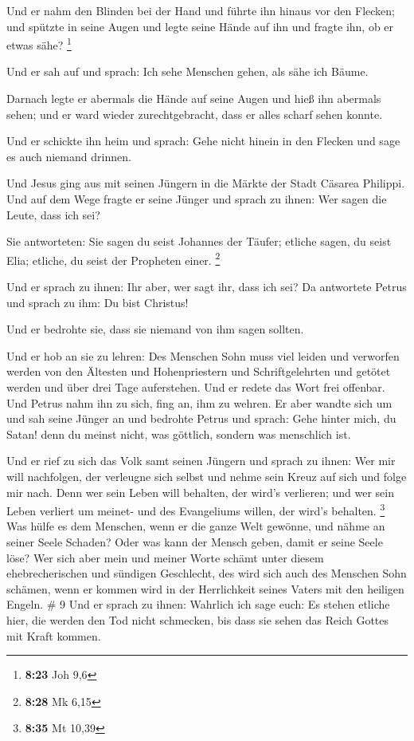  Und er nahm den Blinden bei der Hand und führte ihn hinaus
vor den Flecken; und spützte in seine Augen und legte seine Hände auf
ihn und fragte ihn, ob er etwas sähe? \footnote{\textbf{8:23} Joh 9,6}

 Und er sah auf und sprach: Ich sehe Menschen gehen, als
sähe ich Bäume.

 Darnach legte er abermals die Hände auf seine Augen und
hieß ihn abermals sehen; und er ward wieder zurechtgebracht, dass er
alles scharf sehen konnte.

 Und er schickte ihn heim und sprach: Gehe nicht hinein in
den Flecken und sage es auch niemand drinnen.

 Und Jesus ging aus mit seinen Jüngern in die Märkte der
Stadt Cäsarea Philippi. Und auf dem Wege fragte er seine Jünger und
sprach zu ihnen: Wer sagen die Leute, dass ich sei?

 Sie antworteten: Sie sagen du seist Johannes der Täufer;
etliche sagen, du seist Elia; etliche, du seist der Propheten einer.
\footnote{\textbf{8:28} Mk 6,15}

 Und er sprach zu ihnen: Ihr aber, wer sagt ihr, dass ich
sei? Da antwortete Petrus und sprach zu ihm: Du bist Christus!

 Und er bedrohte sie, dass sie niemand von ihm sagen
sollten.

 Und er hob an sie zu lehren: Des Menschen Sohn muss viel
leiden und verworfen werden von den Ältesten und Hohenpriestern und
Schriftgelehrten und getötet werden und über drei Tage auferstehen.
 Und er redete das Wort frei offenbar. Und Petrus nahm ihn
zu sich, fing an, ihm zu wehren.  Er aber wandte sich um
und sah seine Jünger an und bedrohte Petrus und sprach: Gehe hinter
mich, du Satan! denn du meinst nicht, was göttlich, sondern was
menschlich ist.

 Und er rief zu sich das Volk samt seinen Jüngern und
sprach zu ihnen: Wer mir will nachfolgen, der verleugne sich selbst und
nehme sein Kreuz auf sich und folge mir nach.  Denn wer
sein Leben will behalten, der wird's verlieren; und wer sein Leben
verliert um meinet- und des Evangeliums willen, der wird's behalten.
\footnote{\textbf{8:35} Mt 10,39}  Was hülfe es dem
Menschen, wenn er die ganze Welt gewönne, und nähme an seiner Seele
Schaden?  Oder was kann der Mensch geben, damit er seine
Seele löse?  Wer sich aber mein und meiner Worte schämt
unter diesem ehebrecherischen und sündigen Geschlecht, des wird sich
auch des Menschen Sohn schämen, wenn er kommen wird in der Herrlichkeit
seines Vaters mit den heiligen Engeln. \# 9  Und er sprach
zu ihnen: Wahrlich ich sage euch: Es stehen etliche hier, die werden den
Tod nicht schmecken, bis dass sie sehen das Reich Gottes mit Kraft
kommen.

